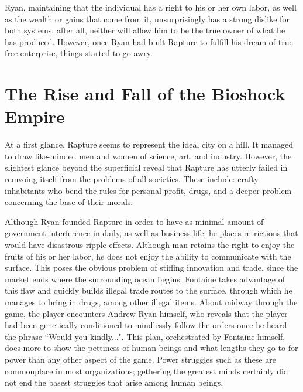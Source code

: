 \documentclass{article}
\begin{document}
Ryan, maintaining that the individual has a right to his or her own labor, as well as the wealth or gains that 
come from it, unsurprisingly has a strong dislike for both systems; after all, neither will allow him to 
be the true owner of what he has produced. However, once Ryan had built Rapture to fulfill his dream of 
true free enterprise, things started to go awry. 

\section{The Rise and Fall of the Bioshock Empire}
At a first glance, Rapture seems to represent the ideal city on a hill. It managed to draw like-minded men and
women of science, art, and industry. However, the slightest glance beyond the superficial reveal that Rapture
has utterly failed in remvoing itself from the problems of all societies. These include: crafty inhabitants
who bend the rules for personal profit, drugs, and a deeper problem concerning the base of their morals. 

Although Ryan founded Rapture in order to have as minimal amount of government interference in daily, as well 
as business life, he places retrictions that would have disastrous ripple effects.  Although man retains
the right to enjoy the fruits of his or her labor, he does not enjoy the ability to communicate with the 
surface. This poses the obvious problem of stifling innovation and trade, since the market ends where the 
surrounding ocean begins. Fontaine takes advantage of this flaw and quickly builds illegal trade routes to the
surface, through which he manages to bring in drugs, among other illegal items. About midway through the game,
the player encounters  Andrew Ryan himself, who reveals that the player had been genetically conditioned to
mindlessly follow the orders once he heard the phrase ``Would you kindly...". This plan, orchestrated by 
Fontaine himself, does more to show the pettiness of human beings and what lengths they go to for power than 
any other aspect of the game. Power struggles such as these are commonplace in most organizations; 
gethering the greatest minds certainly did not end the basest struggles that arise among human beings. 
\end{document}
